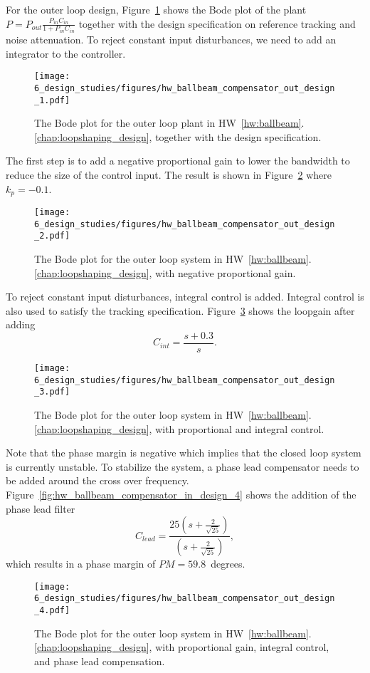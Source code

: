 \clearpage

For the outer loop design, Figure~\ref{fig:hw_ballbeam_compensator_out_design_1} shows the Bode plot of the plant $P=P_{out}\frac{P_{in}C_{in}}{1+P_{in}C_{in}}$ together with the design specification on reference tracking and noise attenuation.  To reject constant input disturbances, we need to add an integrator to the controller.  
%
\begin{figure}[H]
   \centering
   \texttt{[image: 6\_design\_studies/figures/hw\_ballbeam\_compensator\_out\_design\_1.pdf]}
   \caption{The Bode plot for the outer loop plant in HW~\ref{hw:ballbeam}.\ref{chap:loopshaping_design}, together with the design specification.}
   \label{fig:hw_ballbeam_compensator_out_design_1}
\end{figure}
The first step is to add a negative proportional gain to lower the bandwidth to reduce the size of the control input.  The result is shown in Figure~\ref{fig:hw_ballbeam_compensator_out_design_2} where $k_p=-0.1$.
\begin{figure}[H]
   \centering
   \texttt{[image: 6\_design\_studies/figures/hw\_ballbeam\_compensator\_out\_design\_2.pdf]}
   \caption{The Bode plot for the outer loop system in HW~\ref{hw:ballbeam}.\ref{chap:loopshaping_design}, with negative proportional gain.}
   \label{fig:hw_ballbeam_compensator_out_design_2}
\end{figure}
To reject constant input disturbances, integral control is added.  Integral control is also used to satisfy the tracking specification.  
Figure~\ref{fig:hw_ballbeam_compensator_out_design_3}
shows the loopgain after adding
\[
C_{int} = \frac{s+0.3}{s}.
\]
\begin{figure}[H]
   \centering
   \texttt{[image: 6\_design\_studies/figures/hw\_ballbeam\_compensator\_out\_design\_3.pdf]}
   \caption{The Bode plot for the outer loop system in HW~\ref{hw:ballbeam}.\ref{chap:loopshaping_design}, with proportional and integral control.}
   \label{fig:hw_ballbeam_compensator_out_design_3}
\end{figure}
Note that the phase margin is negative which implies that the closed loop system is currently unstable. 
To stabilize the system, a phase lead compensator needs to be added around the cross over frequency.  Figure~\ref{fig:hw_ballbeam_compensator_in_design_4} shows the addition of the phase lead filter
\[
C_{lead} = \frac{25(s+\frac{2}{\sqrt{25}})}{(s+\frac{2}{\sqrt{25}})},
\]
which results in a phase margin of $PM=59.8$~degrees.
\begin{figure}[H]
   \centering
   \texttt{[image: 6\_design\_studies/figures/hw\_ballbeam\_compensator\_out\_design\_4.pdf]}
   \caption{The Bode plot for the outer loop system in HW~\ref{hw:ballbeam}.\ref{chap:loopshaping_design}, with proportional gain, integral control, and phase lead compensation.}
   \label{fig:hw_ballbeam_compensator_out_design_4}
\end{figure}
